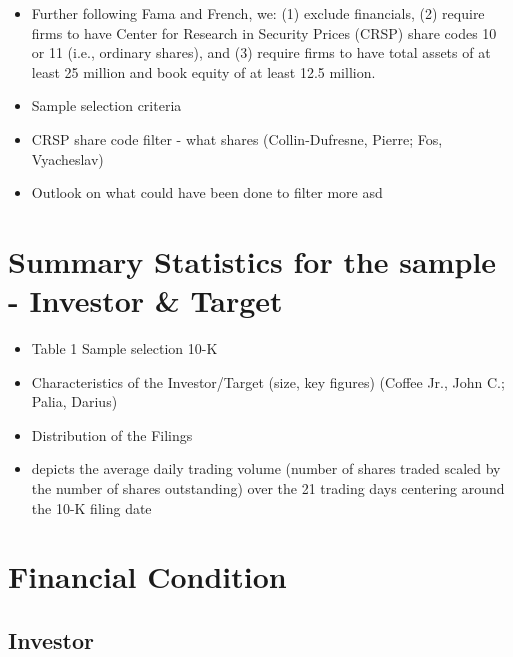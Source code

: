 \documentclass[12pt]{article}
\begin{document}
\begin{itemize}
        \item Further following Fama and French, we: (1) exclude financials, (2) require firms to have Center for Research in Security Prices (CRSP) share codes 10 or 11 (i.e., ordinary shares), and (3) require firms to have total assets of at least 25 million and book equity of at least 12.5 million. \citet{Choi2012}
        \item Sample selection criteria
        \item CRSP share code filter - what shares (Collin-Dufresne, Pierre; Fos, Vyacheslav)
        \item Outlook on what could have been done to filter more asd
    \end{itemize}

\section{Summary Statistics for the sample - Investor \& Target}

\begin{itemize}
    \item Table 1 Sample selection 10-K \citet{You2009}
    \item Characteristics of the Investor/Target (size, key figures) (Coffee Jr., John C.; Palia, Darius)
    \item Distribution of the Filings
    \item depicts the average daily trading volume (number of shares traded scaled by the number of shares outstanding) over the 21 trading days centering around the 10-K filing date \citet{You2009}
\end{itemize}

\section{Financial Condition}

\subsection{Investor}
\end{document}
